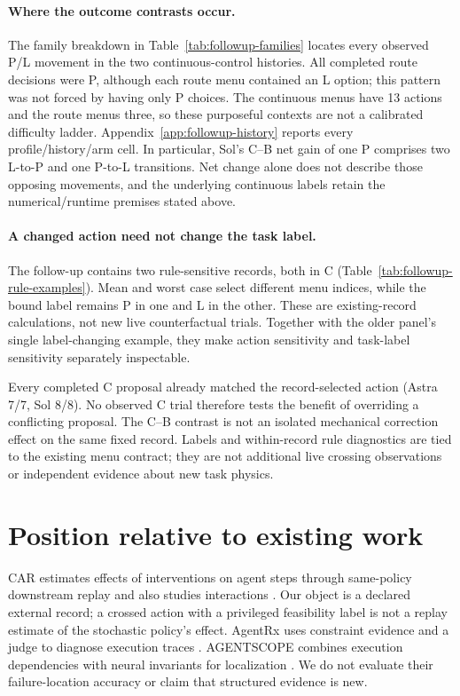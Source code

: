 

\paragraph{Where the outcome contrasts occur.}
The family breakdown in Table~\ref{tab:followup-families} locates every
observed P/L movement in the two continuous-control histories. All completed
route decisions were P, although each route menu contained an L option;
this pattern was not forced by having only P choices. The continuous menus
have 13 actions and the route menus three, so these purposeful contexts are
not a calibrated difficulty ladder. Appendix~\ref{app:followup-history}
reports every profile/history/arm cell. In particular, Sol's C--B net gain
of one P comprises two L-to-P and one P-to-L transitions. Net change alone
does not describe those opposing movements, and the underlying continuous
labels retain the numerical/runtime premises stated above.



\paragraph{A changed action need not change the task label.}
The follow-up contains two rule-sensitive records, both in C
(Table~\ref{tab:followup-rule-examples}). Mean and worst case select different
menu indices, while the bound label remains P in one and L in the other.
These are existing-record calculations, not new live counterfactual trials.
Together with the older panel's single label-changing example, they make
action sensitivity and task-label sensitivity separately inspectable.



Every completed C proposal already matched the record-selected action
(Astra 7/7, Sol 8/8). No observed C trial therefore tests the benefit of
overriding a conflicting proposal. The C--B contrast is not an isolated
mechanical correction effect on the same fixed record. Labels and
within-record rule diagnostics are tied to the existing menu contract;
they are not additional live crossing observations or independent evidence
about new task physics.

\section{Position relative to existing work}
CAR estimates effects of interventions on agent steps through same-policy
downstream replay and also studies interactions \citep{shah2026car}.
Our object is a declared external record; a crossed action with a privileged
feasibility label is not a replay estimate of the stochastic policy's effect.
AgentRx uses constraint evidence and a judge to diagnose execution traces
\citep{barke2026agentrx}. AGENTSCOPE combines execution dependencies with
neural invariants for localization \citep{bi2026agentscope}. We do not evaluate
their failure-location accuracy or claim that structured evidence is new.


